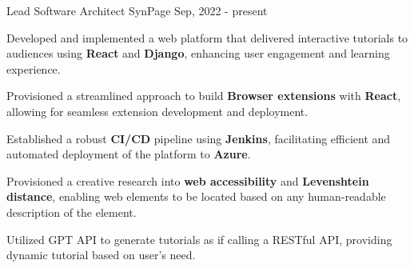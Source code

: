 

\begin{cventries}

\cventry
	{Lead Software Architect} %
	{SynPage} %
	{} %
	{Sep, 2022 - present} %
	{
		\begin{cvitems} %
			\item Developed and implemented a web platform that delivered interactive tutorials to audiences using \textbf{React} and \textbf{Django}, enhancing user engagement and learning experience.
			\item Provisioned a streamlined approach to build \textbf{Browser extensions} with \textbf{React}, allowing for seamless extension development and deployment.
			\item Established a robust \textbf{CI/CD} pipeline using \textbf{Jenkins}, facilitating efficient and automated deployment of the platform to \textbf{Azure}.
			\item Provisioned a creative research into \textbf{web accessibility} and \textbf{Levenshtein distance}, enabling web elements to be located based on any human-readable description of the element. 
			\item Utilized GPT API to generate tutorials as if calling a RESTful API, providing dynamic tutorial based on user's need.
		\end{cvitems}
	}

\end{cventries}
